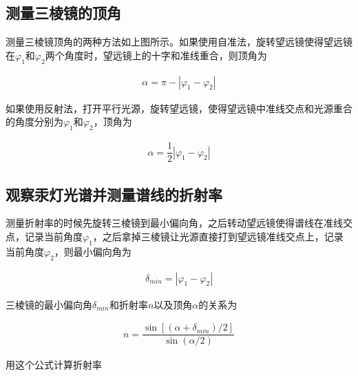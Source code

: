 \documentclass{article}
\begin{document}
\subsection{测量三棱镜的顶角}

测量三棱镜顶角的两种方法如上图所示。如果使用自准法，旋转望远镜使得望远镜在$\varphi_1$和$\varphi_2$两个角度时，望远镜上的十字和准线重合，则顶角为

\begin{equation*}
  \begin{aligned}
    \alpha = \pi - \left| \varphi_1 - \varphi_2 \right|
  \end{aligned}
\end{equation*}

如果使用反射法，打开平行光源，旋转望远镜，使得望远镜中准线交点和光源重合的角度分别为$\varphi_1$和$\varphi_2$，顶角为

\begin{equation*}
  \begin{aligned}
    \alpha = \dfrac{1}{2}  \left| \varphi_1 - \varphi_2 \right|
  \end{aligned}
\end{equation*}

\subsection{观察汞灯光谱并测量谱线的折射率}

测量折射率的时候先旋转三棱镜到最小偏向角，之后转动望远镜使得谱线在准线交点，记录当前角度$\varphi_1$，之后拿掉三棱镜让光源直接打到望远镜准线交点上，记录当前角度$\varphi_2$，则最小偏向角为

\begin{equation*}
  \begin{aligned}
    \delta_{min} = \left| \varphi_1 - \varphi_2 \right|
  \end{aligned}
\end{equation*}

三棱镜的最小偏向角$\delta_{min}$和折射率$n$以及顶角$\alpha$的关系为

\begin{equation*}
  \begin{aligned}
    n = \dfrac{\sin \left[ \left( \alpha + \delta_{min} \right)/2 \right]}{\sin \left( \alpha /2 \right)} 
  \end{aligned}
\end{equation*}

用这个公式计算折射率
\end{document}
